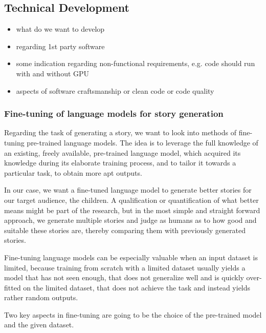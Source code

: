 \subsection{Technical Development}

\begin{itemize}
    \item what do we want to develop                                   
    \item regarding 1st party software 
    \item some indication regarding non-functional requirements, e.g. code should run with and without GPU
    \item aspects of software craftsmanship or clean code or code quality
\end{itemize}

\subsubsection{Fine-tuning of language models for story generation}

Regarding the task of generating a story, we want to look into methods of fine-tuning pre-trained language models.
The idea is to leverage the full knowledge of an existing, freely available, pre-trained language model, which acquired its knowledge during its elaborate training process, and to tailor it towards a particular task, to obtain more apt outputs.

In our case, we want a fine-tuned language model to generate better stories for our target audience, the children.
A qualification or quantification of what better means might be part of the research, but in the most simple and straight forward approach, we generate multiple stories and judge as humans as to how good and suitable these stories are, thereby comparing them with previously generated stories.

Fine-tuning language models can be especially valuable when an input dataset is limited, because training from scratch with a limited dataset usually yields a model that has not seen enough, that does not generalize well and is quickly over-fitted on the limited dataset, that does not achieve the task and instead yields rather random outputs.

Two key aspects in fine-tuning are going to be the choice of the pre-trained model and the given dataset.
